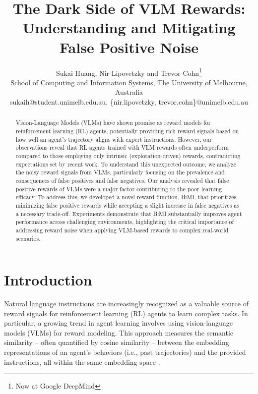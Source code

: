 \documentclass{article}
\title{The Dark Side of VLM Rewards: Understanding and Mitigating False Positive Noise}
\author{
	Sukai Huang,
    Nir Lipovetzky and 
    Trevor Cohn\thanks{Now at Google DeepMind}\\
	School of Computing and Information Systems, The University of Melbourne, Australia\\
    sukaih@student.unimelb.edu.au, \{nir.lipovetzky,
    trevor.cohn\}@unimelb.edu.au \\
}
\theoremstyle{plain}
\theoremstyle{definition}
\theoremstyle{remark}
\begin{document}
\maketitle


\begin{abstract}
    Vision-Language Models (VLMs) have shown promise as reward models for reinforcement learning (RL) agents, potentially providing rich reward signals based on how well an agent's trajectory aligns with expert instructions. However, our observations reveal that RL agents trained with VLM rewards often underperform compared to those employing only intrinsic (exploration-driven) rewards, contradicting expectations set by recent work. 
	To understand this unexpected outcome, we analyze the noisy reward signals from VLMs, particularly focusing on the prevalence and consequences of false positives and false negatives. Our analysis revealed that false positive rewards of VLMs were a major factor contributing to the poor learning efficacy. 
	To address this, we developed a novel reward function, \textsc{BiMI}, that prioritizes minimizing false positive rewards while accepting a slight increase in false negatives as a necessary trade-off. Experiments demonstrate that \textsc{BiMI} substantially improves agent performance across challenging environments, highlighting the critical importance of addressing reward noise when applying VLM-based rewards to complex real-world scenarios.
\end{abstract}



\section{Introduction}
\label{sec:introduction}

Natural language instructions are increasingly recognized as a valuable source of reward signals for reinforcement learning (RL) agents to learn complex tasks. In particular, a growing trend in agent learning involves using vision-language models (VLMs) for reward modeling. This approach measures the semantic similarity -- often quantified by cosine similarity -- between the embedding representations of an agent's behaviors (i.e., past trajectories) and the provided instructions, all within the same embedding space \citep{Kaplan2017BeatingAW, Goyal2019UsingNL, Goyal2020PixL2RGR, du2023guiding}.
\end{document}
